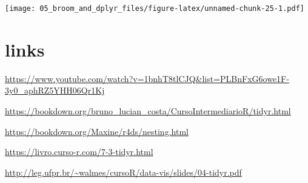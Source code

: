 \documentclass[
]{book}
\begin{document}
\texttt{[image: 05\_broom\_and\_dplyr\_files/figure-latex/unnamed-chunk-25-1.pdf]}

\hypertarget{links}{%
\section{links}\label{links}}

\url{https://www.youtube.com/watch?v=1bnhT8tlCJQ\&list=PLBnFxG6owe1F-3y0_aphRZ5YHH06Qr1Kj}

\url{https://bookdown.org/bruno_lucian_costa/CursoIntermediarioR/tidyr.html}

\url{https://bookdown.org/Maxine/r4ds/nesting.html}

\url{https://livro.curso-r.com/7-3-tidyr.html}

\url{http://leg.ufpr.br/~walmes/cursoR/data-vis/slides/04-tidyr.pdf}

  
\end{document}
